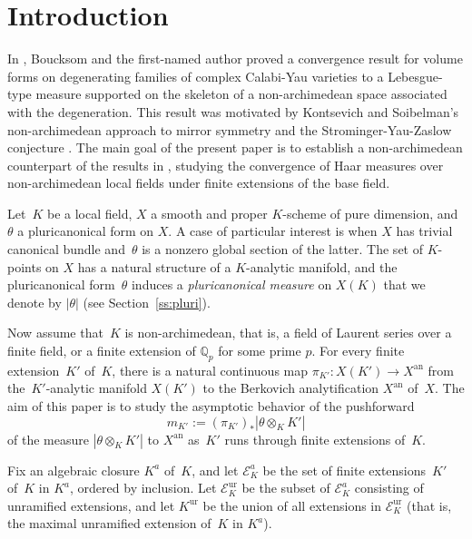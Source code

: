 \documentclass[11pt]{article}
\let\mathcal\mathscr
\theoremstyle{definition}
\numberwithin{equation}{subsection}
\newcommand{\Q}{\ensuremath{\mathbb{Q}}}
\newcommand{\an}{\mathrm{an}}
\newcommand{\ur}{\mathrm{ur}}
\let\form\theta
\begin{document}
\section{Introduction}\label{sec:intro}

In \cite{BJ}, Boucksom and the first-named author proved a convergence result for volume forms on degenerating families of complex Calabi-Yau varieties to a Lebesgue-type measure supported on the skeleton of a non-archimedean space associated with the degeneration. This result was motivated by Kontsevich and Soibelman's non-archimedean approach to mirror symmetry and the Strominger-Yau-Zaslow conjecture \cite{KS}. The main goal of the present paper is to establish a non-archimedean counterpart of the results in \cite{BJ}, studying the convergence of Haar measures over non-archimedean local fields under finite extensions of the base field.

Let~$K$ be a local field, $X$ a smooth and proper $K$\nobreakdash-scheme of pure dimension, and~$\form$ a pluricanonical form on $X$. A case of particular interest is when $X$ has trivial canonical bundle and~$\form$ is a nonzero global section of the latter. The set of $K$\nobreakdash-points on $X$ has a natural structure of a $K$\nobreakdash-analytic manifold, and the pluricanonical form~$\form$ induces a
{\em pluricanonical measure} on $X(K)$ that we denote by $|\form|$ (see Section~\ref{ss:pluri}).

Now assume that~$K$ is non-archimedean, that is, a field of Laurent series over a finite field, or a finite extension of $\Q_p$ for some prime $p$. For every finite extension~$K'$ of~$K$, there is a natural continuous map
$\pi_{K'}\colon X(K')\to X^{\an}$
from the~$K'$-analytic manifold $X(K')$ to the Berkovich analytification $X^{\an}$ of~$X$. The aim of this paper is to study the asymptotic behavior of the pushforward
\begin{equation*}
m_{K'}:=(\pi_{K'})_*|\form\otimes_K K'|
\end{equation*}
of the measure $|\form\otimes_K K'|$ to $X^{\an}$ as~$K'$ runs through
finite extensions of~$K$.

Fix an algebraic closure $K^a$ of~$K$, and let $\mathcal{E}^a_K$ be the set of finite extensions~$K'$ of~$K$ in $K^a$, ordered by inclusion.
Let $\mathcal{E}^{\ur}_K$ be the subset of $\mathcal{E}^a_K$
consisting of unramified extensions,
and let $K^{\ur}$ be the union of all extensions in $\mathcal{E}^{\ur}_K$ (that is, the maximal unramified extension of~$K$ in $K^a$).
\end{document}
